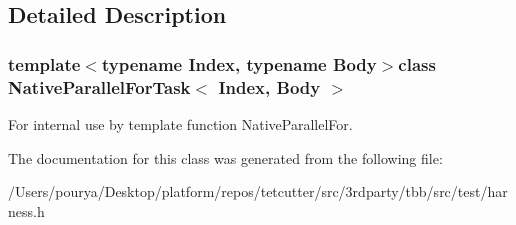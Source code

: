 \subsection{Detailed Description}
\subsubsection*{template$<$typename Index, typename Body$>$class Native\+Parallel\+For\+Task$<$ Index, Body $>$}

For internal use by template function Native\+Parallel\+For. 

The documentation for this class was generated from the following file\+:\begin{DoxyCompactItemize}
\item 
/\+Users/pourya/\+Desktop/platform/repos/tetcutter/src/3rdparty/tbb/src/test/harness.\+h\end{DoxyCompactItemize}
